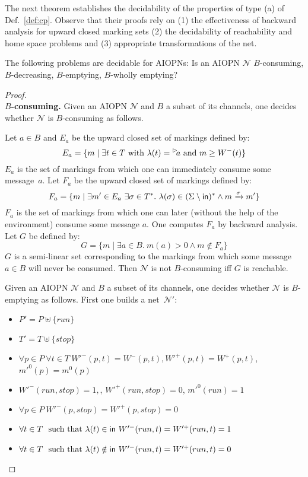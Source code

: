 \smallskip
The next theorem establishes the decidability of the properties
of type (a) of Def.~\ref{def:cp}. 
Observe that their proofs rely on  (1) the effectiveness of backward analysis 
for upward closed marking sets (2) the decidability
of reachability and home space problems and (3)  appropriate
transformations of the net.


\begin{theorem}
The following problems are decidable for AIOPNs: Is an AIOPN $\mathcal N$  $B$-consuming,
$B$-decreasing,  $B$-emptying,  $B$-wholly emptying?
\end{theorem}
\begin{proof}~\\
{\bf $B$-consuming.}
Given an AIOPN $\mathcal N$ and $B$ a subset of its channels, one
decides whether $\mathcal N$ is $B$-consuming as follows.

\smallskip\noindent
Let $a \in B$ and $E_a$ be the upward closed set of markings defined by:\\
\[E_a=\{m\mid \exists t \in T \mbox{ with }\lambda(t)=\inact{a} \mbox{ and } m\geq W^-(t)\}\] 
$E_a$ is the set of markings from which one can immediately consume some message~$a$.
Let $F_a$ be the upward closed set of markings defined by:\\ 
\[
	F_a=\{m\mid \exists m'\in E_a\ \exists \sigma \in T^*.\ \lambda(\sigma) \in (\Sigma\setminus \mathsf{in})^* \wedge m \xrightarrow{\sigma} m'\}
\]
$F_a$ is the set of markings from which one can later (without the help of the environment)
consume some message $a$. One computes $F_a$ by backward analysis. Let $G$ be defined 
by: 
\[
G=\{m \mid \exists a \in B. \ m(a)>0 \wedge m \notin F_a\}
\]
$G$ is a semi-linear set corresponding to the markings
from which some message $a\in B$ will never be consumed. 
Then  $\mathcal N$ is not $B$-consuming
iff $G$ is reachable.

\smallskip{}
Given an AIOPN $\mathcal N$ and $B$ a subset of its channels, one
decides whether $\mathcal N$ is $B$-emptying as follows.
First one builds a net~$\mathcal N'$: 

\begin{itemize}
%
	\item $P'=P\uplus \{run\}$
%
	\item $T'=T\uplus \{stop\}$
%
	\item $\forall p \in P\ \forall t \in T\ W'^-(p,t)=W^-(p,t), W'^+(p,t)=W^+(p,t)$, $m'^0(p)=m^0(p)$
%
	\item $W'^-(run,stop)=1,$, $W'^+(run,stop)=0$, $m'^0(run)=1$
%
	\item $\forall p \in P\  W'^-(p,stop)=W'^+(p,stop)=0$
%
	\item $\forall t \in T\ \mbox{ such that }\lambda(t)\in \mathsf{in}\ W'^-(run,t)=W'^+(run,t)=1$
%
	\item $\forall t \in T\ \mbox{ such that }\lambda(t)\notin \mathsf{in}\ W'^-(run,t)=W'^+(run,t)=0$
%
\end{itemize}


\end{proof}
